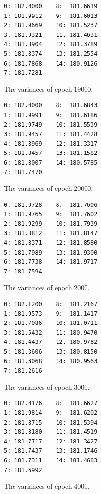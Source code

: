 \documentclass[a4paper, 10pt, notitlepage, twocolumn]{article}
\begin{document}
\begin{figure}[!ht]
 \begin{verbatim}
0: 182.0000    8:  181.6619
1: 181.9912    9:  181.6013
2: 181.9669    10: 181.5237
3: 181.9321    11: 181.4631
4: 181.8904    12: 181.3789
5: 181.8374    13: 181.2554
6: 181.7868    14: 180.9126
7: 181.7281
 \end{verbatim}
 \vspace{-20pt} 
 \caption{The variances of epoch $19000$.}
\end{figure}

\begin{figure}[!ht]
 \begin{verbatim}
0: 182.0000    8:  181.6843
1: 181.9991    9:  181.6186
2: 181.9749    10: 181.5539
3: 181.9457    11: 181.4428
4: 181.8969    12: 181.3317
5: 181.8457    13: 181.1582
6: 181.8007    14: 180.5785
7: 181.7470
 \end{verbatim}
 \vspace{-20pt} 
 \caption{The variances of epoch $20000$.}
\end{figure}

\begin{figure}[!ht]
 \begin{verbatim}
0: 181.9728    8:  181.7606
1: 181.9765    9:  181.7602
2: 181.9299    10: 181.7939
3: 181.8812    11: 181.8147
4: 181.8371    12: 181.8580
5: 181.7989    13: 181.9300
6: 181.7738    14: 181.9717
7: 181.7594
 \end{verbatim}
 \vspace{-20pt} 
 \caption{The variances of epoch $2000$.}
\end{figure}

\begin{figure}[!ht]
 \begin{verbatim}
0: 182.1200    8:  181.2167
1: 181.9573    9:  181.1417
2: 181.7086    10: 181.0711
3: 181.5432    11: 180.9470
4: 181.4437    12: 180.9782
5: 181.3606    13: 180.8150
6: 181.3068    14: 180.9563
7: 181.2616
 \end{verbatim}
 \vspace{-20pt} 
 \caption{The variances of epoch $3000$.}
\end{figure}

\begin{figure}[!ht]
 \begin{verbatim}
0: 182.0176    8:  181.6627
1: 181.9814    9:  181.6202
2: 181.8715    10: 181.5394
3: 181.8180    11: 181.4519
4: 181.7717    12: 181.3427
5: 181.7437    13: 181.1746
6: 181.7311    14: 181.4683
7: 181.6992
 \end{verbatim}
 \vspace{-20pt} 
 \caption{The variances of epoch $4000$.}
\end{figure}
\end{document}
